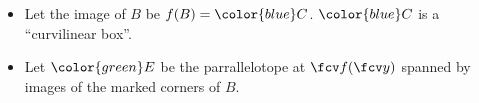 \begin{frame}
\begin{itemize}
\item<7-> Let the image of $B$ be $f(B)={\color{blue}C}$. ${\color{blue}C} $ is a ``curvilinear box''. 
\item<8-> Let ${\color{green}E}$ be the parrallelotope at $\fcv f(\fcv y)$ spanned by images of the marked corners of $B$. 
\end{itemize}

\vskip 10cm
\end{frame}


